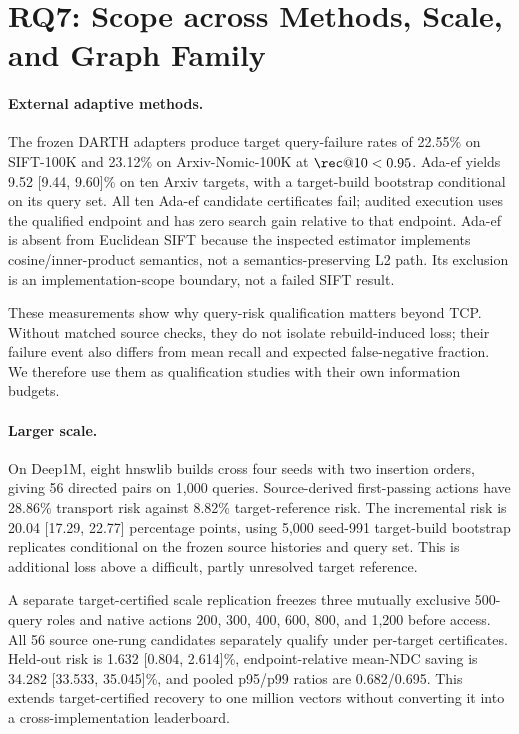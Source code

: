 \section{RQ7: Scope across Methods, Scale, and Graph Family}
\label{sec:families}

\paragraph{External adaptive methods.}
The frozen DARTH adapters produce target query-failure rates of 22.55\% on SIFT-100K and 23.12\% on Arxiv-Nomic-100K at $\rec@10<0.95$. Ada-ef yields 9.52 [9.44, 9.60]\% on ten Arxiv targets, with a target-build bootstrap conditional on its query set. All ten Ada-ef candidate certificates fail; audited execution uses the qualified endpoint and has zero search gain relative to that endpoint. Ada-ef is absent from Euclidean SIFT because the inspected estimator implements cosine/inner-product semantics, not a semantics-preserving L2 path. Its exclusion is an implementation-scope boundary, not a failed SIFT result.

These measurements show why query-risk qualification matters beyond TCP. Without matched source checks, they do not isolate rebuild-induced loss; their failure event also differs from mean recall and expected false-negative fraction. We therefore use them as qualification studies with their own information budgets.

\paragraph{Larger scale.}
On Deep1M, eight hnswlib builds cross four seeds with two insertion orders, giving 56 directed pairs on 1,000 queries. Source-derived first-passing actions have 28.86\% transport risk against 8.82\% target-reference risk. The incremental risk is 20.04 [17.29, 22.77] percentage points, using 5,000 seed-991 target-build bootstrap replicates conditional on the frozen source histories and query set. This is additional loss above a difficult, partly unresolved target reference.

A separate target-certified scale replication freezes three mutually exclusive 500-query roles and native actions 200, 300, 400, 600, 800, and 1,200 before access. All 56 source one-rung candidates separately qualify under per-target certificates. Held-out risk is 1.632 [0.804, 2.614]\%, endpoint-relative mean-NDC saving is 34.282 [33.533, 35.045]\%, and pooled p95/p99 ratios are 0.682/0.695. This extends target-certified recovery to one million vectors without converting it into a cross-implementation leaderboard.

